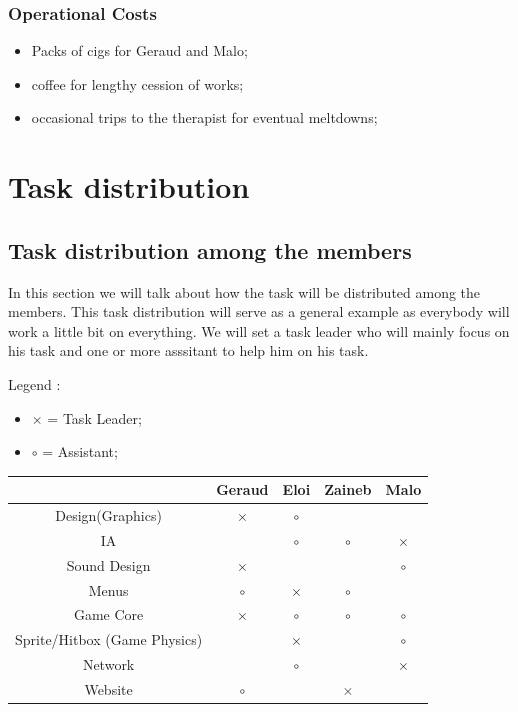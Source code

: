 \documentclass[a4paper, 11pt] {article}
\begin{document}
\subsubsection{Operational Costs}

\begin{itemize}
    \item Packs of cigs for Geraud and Malo;
    \item coffee for lengthy cession of works;
    \item occasional trips to the therapist for eventual meltdowns;
\end{itemize}\par












\newpage
\section{Task distribution}

\subsection{Task distribution among the members}

\par
In this section we will talk about how the task will be distributed among the members. This task distribution 
will serve as a general example as everybody will work a little bit on everything. We will set a task leader who will mainly focus 
on his task and one or more asssitant to help him on his task.
\newline

\par
Legend :
\begin{itemize}
    \item $\times$ = Task Leader;
    \item $\circ$ = Assistant;
\end{itemize}

\begin{center}
\begin{tabular}{|c|c|c|c|c|}
    \hline & Geraud & Eloi & Zaineb & Malo \\
    \hline Design(Graphics) & $\times$ & $\circ$ & & \\
    \hline IA & & $\circ$ & $\circ$ & $\times$ \\
    \hline Sound Design & $\times$ & & & $\circ$ \\
    \hline Menus & $\circ$ & $\times$ & $\circ$ & \\
    \hline Game Core & $\times$ & $\circ$ & $\circ$ & $\circ$ \\
    \hline Sprite/Hitbox (Game Physics) & & $\times$ & & $\circ$ \\
    \hline Network & & $\circ$ & & $\times$ \\
    \hline Website & $\circ$ & & $\times$ & \\
    \hline
\end{tabular}
\end{center}
\end{document}
